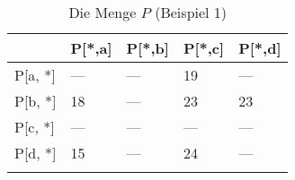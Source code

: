 
\begin{longtable}[c]{|l|l|l|l|l|}
\hline
             & P{[}*,a{]} & P{[}*,b{]} & P{[}*,c{]} & P{[}*,d{]} \\ \hline
\endfirsthead
%
\endhead
%
P{[}a, *{]} & ---        & ---        & 19         & ---        \\ \hline
P{[}b, *{]} & 18         & ---        & 23         & 23         \\ \hline
P{[}c, *{]}  & ---        & ---         & ---        & ---         \\ \hline
P{[}d, *{]}  & 15         & ---         & 24         & ---        \\ \hline
\caption{Die Menge $P$ (Beispiel 1)}
\label{beispiel1p}\\
\end{longtable}